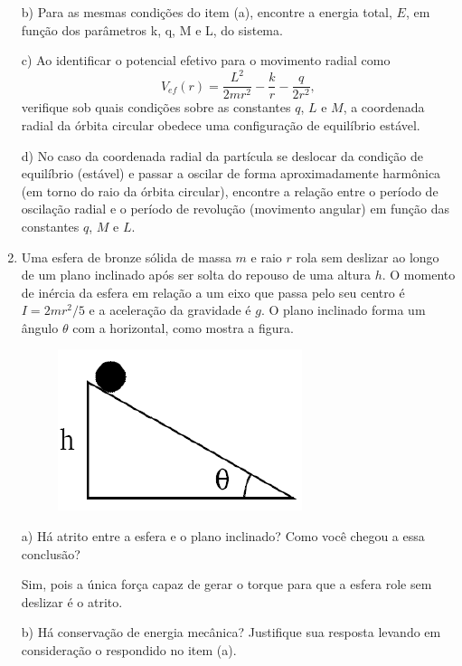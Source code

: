 \begin{enumerate}[start=1,label={\bfseries Q\arabic*.}]
\resposta

b) Para as mesmas condições do item (a), encontre a energia total, $E$, em função dos parâmetros
k, q, M e L, do sistema.

\resposta

c) Ao identificar o potencial efetivo para o movimento radial como
$$
V_{ef}(r) = \frac{L^{2}}{2mr^{2}} - \frac{k}{r} - \frac{q}{2r^{2}},
$$
verifique sob quais condições sobre as constantes $q$, $L$ e $M$, a coordenada radial da órbita circular obedece uma configuração de equilíbrio estável.

\resposta

d) No caso da coordenada radial da partícula se deslocar da condição de equilíbrio (estável) e passar a oscilar de forma aproximadamente harmônica (em torno do raio da órbita circular), encontre a relação entre o período de oscilação radial e o período de revolução (movimento angular) em função das constantes $q$, $M$ e $L$.

\resposta


\item Uma esfera de bronze sólida de massa $m$ e raio $r$ rola sem deslizar ao longo de um plano inclinado após ser solta do repouso de uma altura $h$. O momento de inércia da esfera em relação a um eixo que passa pelo seu centro é $I = 2mr^{2}/5$ e a aceleração da gravidade é $g$. O plano inclinado forma um ângulo $\theta$ com a horizontal, como mostra a figura.

\begin{figure}[H]
\centering
\includegraphics[scale=1]{classica-img/inclinado2.png}
\end{figure}


a) Há atrito entre a esfera e o plano inclinado? Como você chegou a essa conclusão?

\resposta Sim, pois a única força capaz de gerar o torque para que a esfera role sem deslizar é o atrito.

b) Há conservação de energia mecânica? Justifique sua resposta levando em consideração o respondido no item (a).


\end{enumerate}
